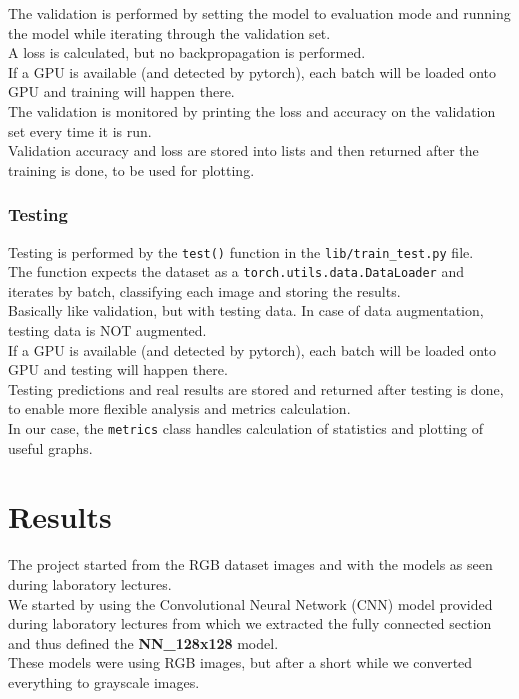 \documentclass{report}
\begin{document}
The validation is performed by setting the model to evaluation mode and running the model while iterating through the validation set. \\
A loss is calculated, but no backpropagation is performed.\\
If a GPU is available (and detected by pytorch), each batch will be loaded onto GPU and training will happen there. \\

The validation is monitored by printing the loss and accuracy on the validation set every time it is run. \\
Validation accuracy and loss are stored into lists and then returned after the training is done, to be used for plotting. \\
\subsection{Testing}
Testing is performed by the \texttt{test()} function in the \texttt{lib/train\_test.py} file. \\
The function expects the dataset as a \texttt{torch.utils.data.DataLoader} and iterates by batch, classifying each image and storing the results. \\
Basically like validation, but with testing data. In case of data augmentation, testing data is NOT augmented.\\

If a GPU is available (and detected by pytorch), each batch will be loaded onto GPU and testing will happen there. \\

Testing predictions and real results are stored and returned after testing is done, to enable more flexible analysis and metrics calculation.\\
In our case, the \texttt{metrics} class handles calculation of statistics and plotting of useful graphs.\\

\chapter{Results}
The project started from the RGB dataset images and with the models as seen during laboratory lectures.\\
We started by using the Convolutional Neural Network (CNN) model provided during laboratory lectures from which we extracted the fully connected
section and thus defined the \textbf{NN\_128x128} model.\\
These models were using RGB images, but after a short while we converted everything to grayscale images.\\
\end{document}
